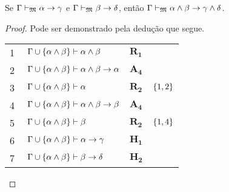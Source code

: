 \vspace{.5\baselineskip}
\begin{tcolorbox}[enhanced jigsaw, breakable, sharp corners, colframe=black, colback=white, boxrule=0.5pt, left=1.5mm, right=1.5mm, top=1.5mm, bottom=1.5mm]
    \begin{lemma}\label{conjunction.exchange}
        Se $\Gamma\mathrel{\vdash}_\mathfrak{M}\alpha\to\gamma$ e $\Gamma\mathrel{\vdash}_\mathfrak{M}\beta\to\delta$, então $\Gamma\mathrel{\vdash}_\mathfrak{M}\alpha\wedge\beta\to\gamma\wedge\delta$.
        \begin{proof}
        Pode ser demonstrado pela dedução que segue.

        \vspace{0.5\baselineskip}
        \footnotesize
        \setlength{\rowskip}{0.5\baselineskip}
        \begin{xltabular}{\textwidth}{r | X l l}
            \scriptsize{\phantom{0}1}\phantom{ } & $\ \Gamma\cup\set{\alpha\wedge\beta}\vdash\alpha\wedge\beta$                     & $\hyperref[modal.rule.1]{\mathbf{R_1}}$\phantom{1} & \\[\rowskip]
            \scriptsize{\phantom{0}2}\phantom{ } & $\ \Gamma\cup\set{\alpha\wedge\beta}\vdash\alpha\wedge\beta\to\alpha$            & $\hyperref[modal.axiom.4]{\mathbf{A_4}}$           & \\[\rowskip]
            \scriptsize{\phantom{0}3}\phantom{ } & $\ \Gamma\cup\set{\alpha\wedge\beta}\vdash\alpha$                                & $\hyperref[modal.rule.2]{\mathbf{R_2}}$            & $\left\{1,2\right\}$\\[\rowskip]
            \scriptsize{\phantom{0}4}\phantom{ } & $\ \Gamma\cup\set{\alpha\wedge\beta}\vdash\alpha\wedge\beta\to\beta$             & $\hyperref[modal.axiom.4]{\mathbf{A_4}}$           & \\[\rowskip]
            \scriptsize{\phantom{0}5}\phantom{ } & $\ \Gamma\cup\set{\alpha\wedge\beta}\vdash\beta$                                 & $\hyperref[modal.rule.2]{\mathbf{R_2}}$            & $\left\{1,4\right\}$\\[\rowskip]
            \scriptsize{\phantom{0}6}\phantom{ } & $\ \Gamma\cup\set{\alpha\wedge\beta}\vdash\alpha\to\gamma$                       & $\mathbf{H_1}$                                     & \\[\rowskip]
            \scriptsize{\phantom{0}7}\phantom{ } & $\ \Gamma\cup\set{\alpha\wedge\beta}\vdash\beta\to\delta$                        & $\mathbf{H_2}$                                     & \\[\rowskip]

\end{xltabular}
\end{proof}
\end{lemma}
\end{tcolorbox}
